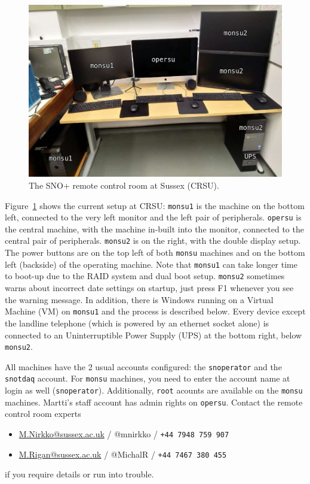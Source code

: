 \documentclass[12pt, a4paper]{article}
\begin{document}
\begin{figure}[htp]
	\centering
	\includegraphics[width=\textwidth]{images/CRSU_final}
	\caption{The SNO+ remote control room at Sussex (CRSU).}
	\label{crsu_setup}
\end{figure}

Figure~\ref{crsu_setup} shows the current setup at CRSU: {\tt monsu1} is the machine on the bottom left, connected to the very left monitor and the left pair of peripherals. {\tt opersu} is the central machine, with the machine in-built into the monitor, connected to the central pair of peripherals. {\tt monsu2} is on the right, with the double display setup. The power buttons are on the top left of both {\tt monsu} machines and on the bottom left (backside) of the operating machine. Note that {\tt monsu1} can take longer time to boot-up due to the RAID system and dual boot setup. {\tt monsu2} sometimes warns about incorrect date settings on startup, just press F1 whenever you see the warning message. In addition, there is Windows running on a Virtual Machine (VM) on {\tt monsu1} and the process is described below. Every device except the landline telephone (which is powered by an ethernet socket alone) is connected to an Uninterruptible Power Supply (UPS) at the bottom right, below {\tt monsu2}.

All machines have the 2 usual accounts configured: the {\tt snoperator} and the {\tt snotdaq} account. For {\tt monsu} machines, you need to enter the account name at login as well ({\tt snoperator}). Additionally, {\tt root} acounts are available on the {\tt monsu} machines. Martti's staff account has admin rights on {\tt opersu}. Contact the remote control room experts
\begin{itemize}
\item \href{mailto:M.Nirkko@sussex.ac.uk}{M.Nirkko@sussex.ac.uk} / @mnirkko / {\tt +44 7948 759 907}
\item \href{mailto:M.Rigan@sussex.ac.uk}{M.Rigan@sussex.ac.uk} / @MichalR / {\tt +44 7467 380 455}
\end{itemize}
if you require details or run into trouble.
\end{document}
